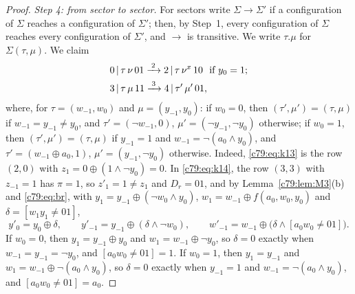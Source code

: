 \begin{proof}
\emph{Step 4: from sector to sector.} For sectors write $\Sigma\to\Sigma'$ if a configuration of $\Sigma$ reaches a configuration of $\Sigma'$; then, by Step~1, every configuration of $\Sigma$ reaches every configuration of $\Sigma'$, and $\to$ is transitive. We write $\tau.\mu$ for $\Sigma(\tau,\mu)$. We claim
\begin{align}
&0\,|\,\tau\,\nu\,01\xrightarrow{\;2\;}2\,|\,\tau\,\nu^x\,10\ \text{ if }y_0=1;\label{c79:eq:k13}\\
&3\,|\,\tau\,\mu\,11\xrightarrow{\;3\;}4\,|\,\tau'\,\mu'\,01,\label{c79:eq:k14}
\end{align}
where, for $\tau=(w_{-1},w_0)$ and $\mu=(y_{-1},y_0)$: if $w_0=0$, then $(\tau',\mu')=(\tau,\mu)$ if $w_{-1}=y_{-1}\ne y_0$, and $\tau'=(\neg w_{-1},0)$, $\mu'=(\neg y_{-1},\neg y_0)$ otherwise; if $w_0=1$, then $(\tau',\mu')=(\tau,\mu)$ if $y_{-1}=1$ and $w_{-1}=\neg(a_0\wedge y_0)$, and $\tau'=(w_{-1}\oplus a_0,1)$, $\mu'=(y_{-1},\neg y_0)$ otherwise. Indeed, \eqref{c79:eq:k13} is the row $(2,0)$ with $z_1=0\oplus(1\wedge\neg y_0)=0$. In \eqref{c79:eq:k14}, the row $(3,3)$ with $z_{-1}=1$ has $\pi=1$, so $z'_1=1\ne z_1$ and $D_r=01$, and by Lemma~\ref{c79:lem:M3}(b) and \eqref{c79:eq:br}, with $y_1=y_{-1}\oplus(\neg w_0\wedge y_0)$, $w_1=w_{-1}\oplus f(a_0,w_0,y_0)$ and $\delta=[w_1y_1\ne01]$,
\[
y'_0=y_0\oplus\delta,\qquad y'_{-1}=y_{-1}\oplus(\delta\wedge\neg w_0),\qquad w'_{-1}=w_{-1}\oplus\bigl(\delta\wedge[a_0w_0\ne01]\bigr).
\]
If $w_0=0$, then $y_1=y_{-1}\oplus y_0$ and $w_1=w_{-1}\oplus\neg y_0$, so $\delta=0$ exactly when $w_{-1}=y_{-1}=\neg y_0$, and $[a_0w_0\ne01]=1$. If $w_0=1$, then $y_1=y_{-1}$ and $w_1=w_{-1}\oplus\neg(a_0\wedge y_0)$, so $\delta=0$ exactly when $y_{-1}=1$ and $w_{-1}=\neg(a_0\wedge y_0)$, and $[a_0w_0\ne01]=a_0$.


\end{proof}

